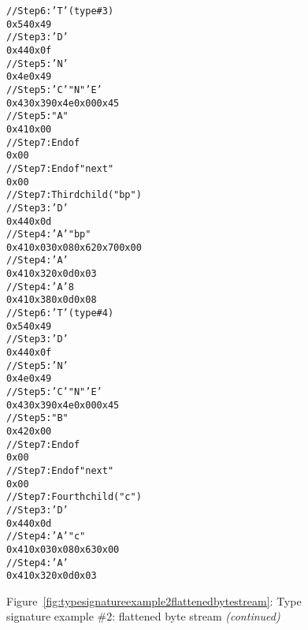 \begin{figure}
\begin{dwflisting}
\begin{alltt}    
    // Step 6: 'T'  (type \#3)
    0x54 0x49
        // Step 3: 'D' 
        0x44 0x0f
        // Step 5: 'N' 
        0x4e 0x49
        // Step 5: 'C'  "N" 'E'
        0x43 0x39 0x4e 0x00 0x45
        // Step 5: "A"
        0x41 0x00
        // Step 7: End of 
        0x00
    // Step 7: End of  "next"
    0x00
// Step 7: Third child ("bp")
    // Step 3: 'D' 
    0x44 0x0d
    // Step 4: 'A'   "bp"
    0x41 0x03 0x08 0x62 0x70 0x00
    // Step 4: 'A'   
    0x41 0x32 0x0d 0x03
    // Step 4: 'A'   8
    0x41 0x38 0x0d 0x08
    // Step 6: 'T'  (type \#4)
    0x54 0x49
        // Step 3: 'D' 
0x44 0x0f
        // Step 5: 'N' 
        0x4e 0x49
        // Step 5: 'C'  "N" 'E'
        0x43 0x39 0x4e 0x00 0x45
        // Step 5: "B"
        0x42 0x00
        // Step 7: End of 
        0x00
    // Step 7: End of  "next"
    0x00
// Step 7: Fourth child ("c")
    // Step 3: 'D' 
    0x44 0x0d
    // Step 4: 'A'   "c"
    0x41 0x03 0x08 0x63 0x00
    // Step 4: 'A'   
    0x41 0x32 0x0d 0x03
\end{alltt}
\end{dwflisting}
\begin{center}
\vspace{2mm}
Figure~\ref{fig:typesignatureexample2flattenedbytestream}: Type signature example \#2: flattened byte stream \textit{(continued)}
\end{center}
\end{figure}
    
